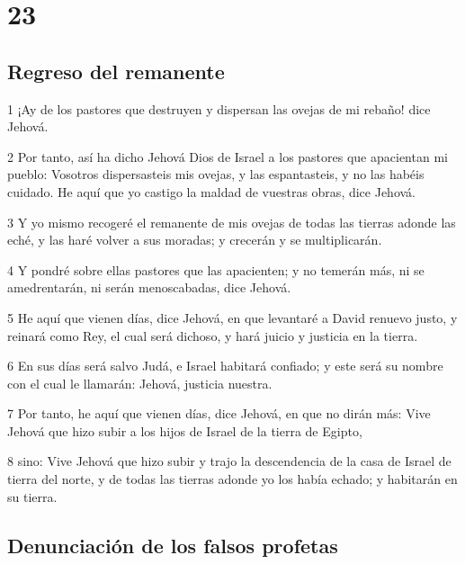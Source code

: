 \chapter{23}

\section*{Regreso del remanente}

\par 1 ¡Ay de los pastores que destruyen y dispersan las ovejas de mi rebaño! dice Jehová.
\par 2 Por tanto, así ha dicho Jehová Dios de Israel a los pastores que apacientan mi pueblo: Vosotros dispersasteis mis ovejas, y las espantasteis, y no las habéis cuidado. He aquí que yo castigo la maldad de vuestras obras, dice Jehová.
\par 3 Y yo mismo recogeré el remanente de mis ovejas de todas las tierras adonde las eché, y las haré volver a sus moradas; y crecerán y se multiplicarán.
\par 4 Y pondré sobre ellas pastores que las apacienten; y no temerán más, ni se amedrentarán, ni serán menoscabadas, dice Jehová.
\par 5 He aquí que vienen días, dice Jehová, en que levantaré a David renuevo justo, y reinará como Rey, el cual será dichoso, y hará juicio y justicia en la tierra. 
\par 6 En sus días será salvo Judá, e Israel habitará confiado; y este será su nombre con el cual le llamarán: Jehová, justicia nuestra. 
\par 7 Por tanto, he aquí que vienen días, dice Jehová, en que no dirán más: Vive Jehová que hizo subir a los hijos de Israel de la tierra de Egipto,
\par 8 sino: Vive Jehová que hizo subir y trajo la descendencia de la casa de Israel de tierra del norte, y de todas las tierras adonde yo los había echado; y habitarán en su tierra.

\section*{Denunciación de los falsos profetas}

